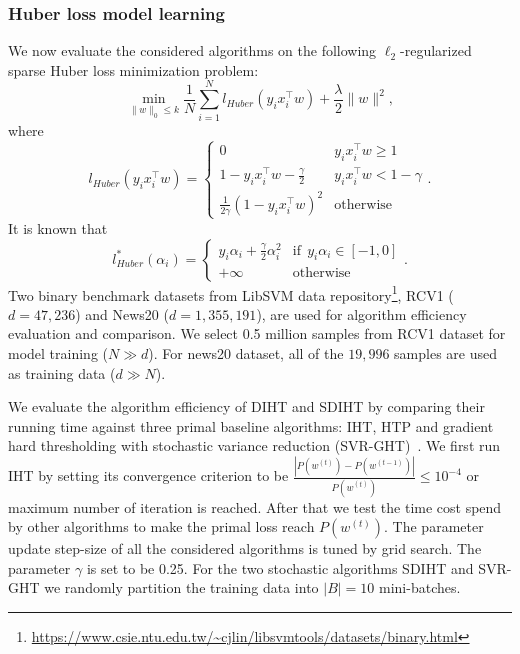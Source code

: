 \documentclass[11pt]{article}
\numberwithin{equation}{section}
\numberwithin{table}{section}
\numberwithin{figure}{section}
\begin{document}
\subsubsection{Huber loss model learning}
\label{subsubsect:huber}
We now evaluate the considered algorithms on the following $\ell_2$-regularized sparse Huber loss minimization problem:
\begin{equation}
\label{eqn:smoothHinge}
\min\limits_{\|w\|_0\le k} \frac{1}{N}\sum\limits_{i=1}^N l_{Huber}(y_ix_i^\top w)+\frac{\lambda}{2} \|w\|^2,
\end{equation}
where
\[
l_{Huber}(y_ix_i^\top w)=\left\{\begin{array}{ll} 0 & y_ix_i^\top w\ge 1 \\
1-y_ix_i^\top w-\frac{\gamma}{2} &  y_ix_i^\top w<1-\gamma \\
\frac{1}{2\gamma} (1-y_ix_i^\top w)^2 & \text{otherwise}
\end{array}\right..
\]
It is known that~\cite{shalev2013stochastic}
\[
l^*_{Huber}(\alpha_i)=\left\{\begin{array}{ll}  y_i\alpha_i+\frac{\gamma}{2}\alpha_i^2 & \text{if}~~y_i\alpha_i\in [-1,0] \\
+\infty & \text{otherwise}\end{array}\right..
\]
Two binary benchmark datasets from LibSVM data repository\footnote{\url{https://www.csie.ntu.edu.tw/~cjlin/libsvmtools/datasets/binary.html}}, RCV1 ($d=47,236$) and News20 ($d=1,355,191$), are used for algorithm efficiency evaluation and comparison. We select 0.5 million samples from RCV1 dataset for model training ($N\gg d$). For news20 dataset, all of the $19,996$ samples are used as training data ($d\gg N$).

We evaluate the algorithm efficiency of DIHT and SDIHT by comparing their running time against three primal baseline algorithms: IHT, HTP and gradient hard thresholding with stochastic variance reduction (SVR-GHT)~\cite{li2016stochastic}. We first run IHT by setting its convergence criterion to be $\frac{|P(w^{(t)})-P(w^{(t-1)})|}{P(w^{(t)})}\le 10^{-4}$ or maximum number of iteration is reached. After that we test the time cost spend by other algorithms to make the primal loss reach $P(w^{(t)})$. The parameter update step-size of all the considered algorithms is tuned by grid search. The parameter $\gamma$ is set to be 0.25. For the two stochastic algorithms SDIHT and SVR-GHT we randomly partition the training data into $|B|=10$ mini-batches.
\end{document}
